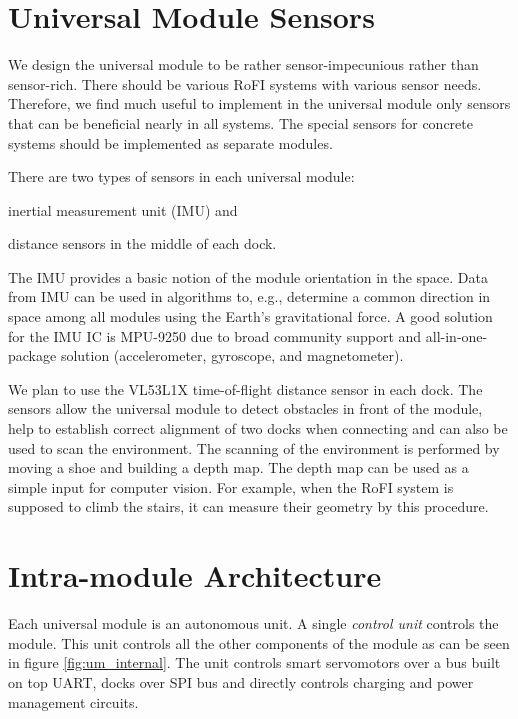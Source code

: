 \section{Universal Module Sensors}

We design the universal module to be rather sensor-impecunious rather than
sensor-rich. There should be various RoFI systems with various sensor needs.
Therefore, we find much useful to implement in the universal module only sensors
that can be beneficial nearly in all systems. The special sensors for concrete
systems should be implemented as separate modules.

There are two types of sensors in each universal module:
\begin{enumerate*}
    \item inertial measurement unit (IMU) and
    \item distance sensors in the middle of each dock.
\end{enumerate*}
The IMU provides a basic notion of the module orientation in the space. Data
from IMU can be used in algorithms to, e.g., determine a common direction in
space among all modules using the Earth's gravitational force. A good solution
for the IMU IC is MPU-9250 \cite{noauthor_mpu-9250_2016} due to broad community
support and all-in-one-package solution (accelerometer, gyroscope, and
magnetometer).

We plan to use the VL53L1X \cite{noauthor_new_2018} time-of-flight distance
sensor in each dock. The sensors allow the universal module to detect obstacles
in front of the module, help to establish correct alignment of two docks when
connecting and can also be used to scan the environment. The scanning of the
environment is performed by moving a shoe and building a depth map. The depth
map can be used as a simple input for computer vision. For example, when the
RoFI system is supposed to climb the stairs, it can measure their geometry by
this procedure.

\section{Intra-module Architecture}

Each universal module is an autonomous unit. A single \emph{control unit}
controls the module. This unit controls all the other components of the module
as can be seen in figure \ref{fig:um_internal}. The unit controls smart
servomotors over a bus built on top UART, docks over SPI bus and directly
controls charging and power management circuits.

